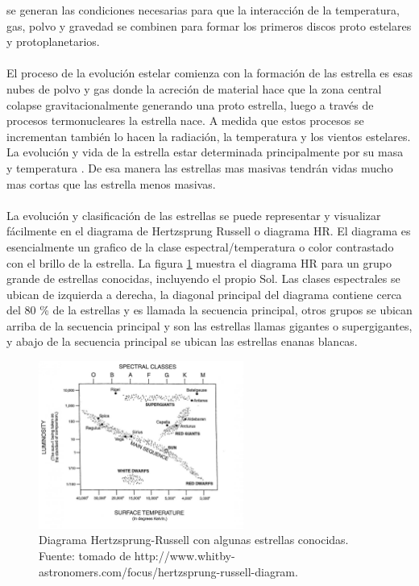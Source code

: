 \documentclass[12pt]{article}
\begin{document}
se generan las condiciones necesarias para que la interacción de la temperatura, gas, polvo y gravedad 
se combinen para formar los primeros discos proto estelares y protoplanetarios.\\
\\
El proceso de la evolución estelar comienza  con la formación de las estrella es esas nubes de polvo y 
gas donde la acreción de material hace que la zona central colapse gravitacionalmente generando una 
proto estrella, luego a través de procesos termonucleares la estrella nace. A medida que estos procesos 
se incrementan también lo hacen la radiación, la temperatura y los vientos estelares. La evolución y 
vida de la estrella estar determinada principalmente por su masa y temperatura \parencite{Whittet2022DustIT}. 
De esa manera las estrellas mas masivas tendrán vidas mucho mas cortas que las estrella menos masivas. \\
\\
La evolución y clasificación de las estrellas se puede representar y visualizar fácilmente en el diagrama 
de Hertzsprung Russell o 
diagrama HR. El diagrama es esencialmente un grafico de la clase espectral/temperatura o color 
contrastado con el brillo de la estrella. La figura \ref{fig:diagrama_HR} muestra el diagrama HR para un 
grupo grande de estrellas conocidas, incluyendo el propio Sol. 
Las clases espectrales se ubican de izquierda a derecha, la diagonal principal del diagrama contiene 
cerca del 80 \% de la estrellas y es llamada la secuencia principal, otros grupos se ubican arriba de 
la secuencia principal y son las estrellas llamas gigantes o supergigantes, y abajo de la secuencia 
principal se ubican las estrellas enanas blancas.
\begin{figure}[H]
    \includegraphics[width=0.6\textwidth]{images/HR_diagram.jpg}
    \centering
    \caption{Diagrama Hertzsprung-Russell con algunas estrellas conocidas. 
    Fuente: tomado de http://www.whitby-astronomers.com/focus/hertzsprung-russell-diagram.}
    \label{fig:diagrama_HR}
\end{figure}
\end{document}
